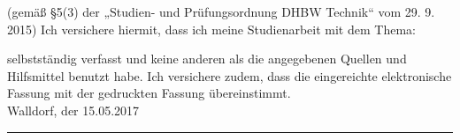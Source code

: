 \begin{spacing}{1.0}
(gemäß §5(3) der „Studien- und Prüfungsordnung DHBW Technik“ vom 29. 9. 2015) \newline
Ich versichere hiermit, dass ich meine Studienarbeit mit dem Thema: 
\begin{quote}
	\textit{\titel} 
\end{quote}  
selbstständig verfasst und keine anderen als die angegebenen Quellen und Hilfsmittel benutzt habe. Ich versichere zudem, dass die eingereichte elektronische Fassung mit der gedruckten Fassung übereinstimmt. \\


Walldorf, der 15.05.2017 \\[4ex]

\rule[-0.2cm]{5cm}{0.5pt} \\

\textsc{\autor} \\[10ex]
\end{spacing}